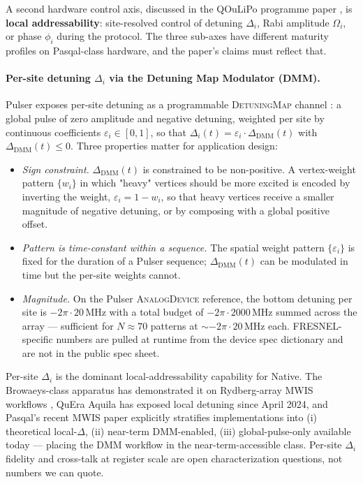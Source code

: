 \documentclass[10pt]{article}
\begin{document}
A second hardware control axis, discussed in the QOuLiPo programme paper \cite{jurczak2026qoulipo}, is \textbf{local addressability}: site-resolved control of detuning $\Delta_i$, Rabi amplitude $\Omega_i$, or phase $\phi_i$ during the protocol. The three sub-axes have different maturity profiles on Pasqal-class hardware, and the paper's claims must reflect that.

\paragraph{Per-site detuning $\Delta_i$ via the Detuning Map Modulator (DMM).}
Pulser exposes per-site detuning as a programmable \textsc{DetuningMap} channel \cite{silverio2022pulser}: a global pulse of zero amplitude and negative detuning, weighted per site by continuous coefficients $\varepsilon_i \in [0,1]$, so that $\Delta_i(t) = \varepsilon_i \cdot \Delta_\text{DMM}(t)$ with $\Delta_\text{DMM}(t) \leq 0$. Three properties matter for application design:
\begin{itemize}[leftmargin=2em, itemsep=0.2em, topsep=0.3em]
\item \emph{Sign constraint.} $\Delta_\text{DMM}(t)$ is constrained to be non-positive. A vertex-weight pattern $\{w_i\}$ in which "heavy" vertices should be more excited is encoded by inverting the weight, $\varepsilon_i = 1 - w_i$, so that heavy vertices receive a smaller magnitude of negative detuning, or by composing with a global positive offset.
\item \emph{Pattern is time-constant within a sequence.} The spatial weight pattern $\{\varepsilon_i\}$ is fixed for the duration of a Pulser sequence; $\Delta_\text{DMM}(t)$ can be modulated in time but the per-site weights cannot.
\item \emph{Magnitude.} On the Pulser \textsc{AnalogDevice} reference, the bottom detuning per site is $-2\pi \cdot 20\,\text{MHz}$ with a total budget of $-2\pi \cdot 2000\,\text{MHz}$ summed across the array --- sufficient for $N \approx 70$ patterns at $\sim$$-2\pi \cdot 20\,\text{MHz}$ each. FRESNEL-specific numbers are pulled at runtime from the device spec dictionary and are not in the public spec sheet.
\end{itemize}
Per-site $\Delta_i$ is the dominant local-addressability capability for Native. The Browaeys-class apparatus has demonstrated it on Rydberg-array MWIS workflows \cite{bornet2024arbitrary}, QuEra Aquila has exposed local detuning since April 2024, and Pasqal's recent MWIS paper \cite{pasqal2025mwis} explicitly stratifies implementations into (i) theoretical local-$\Delta$, (ii) near-term DMM-enabled, (iii) global-pulse-only available today --- placing the DMM workflow in the near-term-accessible class. Per-site $\Delta_i$ fidelity and cross-talk at register scale are open characterization questions, not numbers we can quote.
\end{document}
